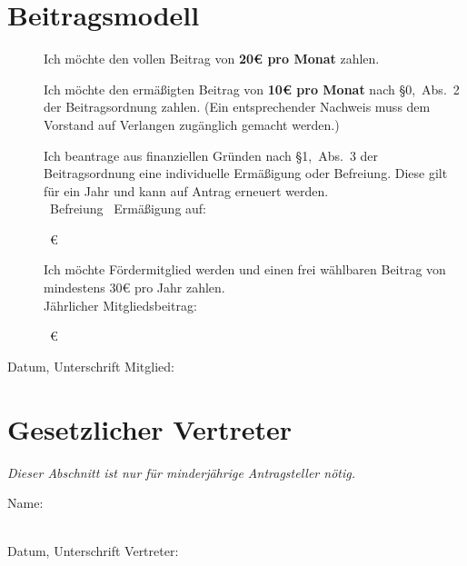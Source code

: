 \documentclass[a4paper,11pt]{scrartcl}
\newcommand{\signskip}{\rule{0pt}{24pt}}
\newcommand{\smallsignskip}{\rule{0pt}{16pt}}
\newcommand{\hinweis}[1]{\emph{#1}}
\begin{document}
\section*{Beitragsmodell}
\begin{description}
  \item[\Square] Ich möchte den vollen Beitrag von \textbf{20€ pro Monat} zahlen.
  \item[\Square] Ich möchte den ermäßigten Beitrag von \textbf{10€ pro Monat}
    nach §0,~Abs.~2 der Beitragsordnung zahlen. (Ein entsprechender Nachweis
    muss dem Vorstand auf Verlangen zugänglich gemacht werden.)
  \item[\Square] Ich beantrage aus finanziellen Gründen nach §1,~Abs.~3 der
    Beitragsordnung eine individuelle Ermäßigung oder Befreiung. Diese gilt für
    ein Jahr und kann auf Antrag erneuert werden. \\
    \Square~Befreiung \hfill
    \Square~Ermäßigung auf: \hrulefill\signskip~€\hfill\phantom{a}
\end{description}

\begin{description}
  \item[\Square] Ich möchte Fördermitglied werden und einen frei wählbaren
    Beitrag von mindestens 30€ pro Jahr zahlen. \\
    Jährlicher Mitgliedsbeitrag: \hrulefill\signskip~€\hfill\phantom{a}
\end{description}
Datum, Unterschrift Mitglied: \hrulefill\smallsignskip

\section*{Gesetzlicher Vertreter}
\hinweis{Dieser Abschnitt ist nur für minderjährige Antragsteller nötig.}

Name: \hrulefill \signskip \\
Datum, Unterschrift Vertreter: \hrulefill \signskip
\end{document}
